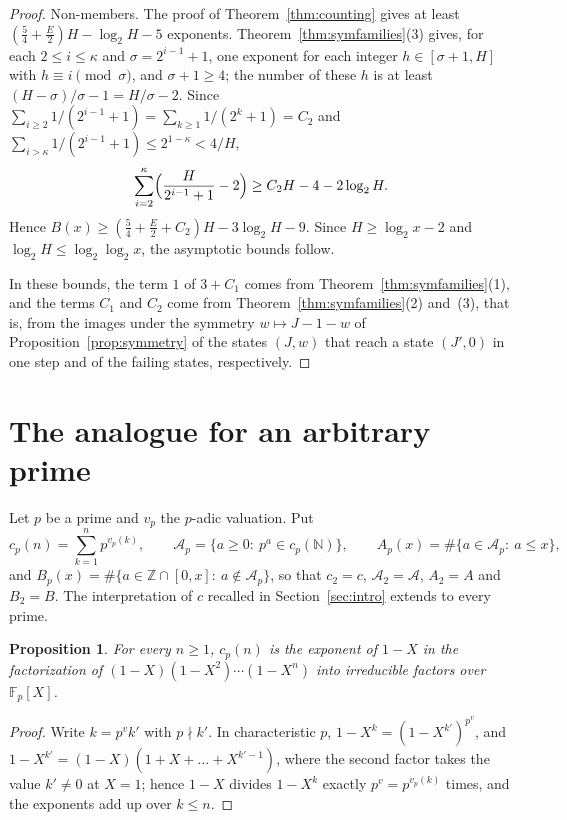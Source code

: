 \documentclass[11pt]{amsart}
\newtheorem{Proposition}[Theorem]{Proposition}
\theoremstyle{definition}
\begin{document}
\begin{proof}
Non-members. The proof of Theorem~\ref{thm:counting} gives at least $(\frac54+\frac E2)H-\log_2H-5$ exponents. Theorem~\ref{thm:symfamilies}(3) gives, for each $2\le i\le\kappa$ and $\sigma=2^{i-1}+1$, one exponent for each integer $h\in[\sigma+1,H]$ with $h\equiv i\pmod\sigma$, and $\sigma+1\ge4$; the number of these $h$ is at least $(H-\sigma)/\sigma-1=H/\sigma-2$. Since $\sum_{i\ge2}1/(2^{i-1}+1)=\sum_{k\ge1}1/(2^k+1)=C_2$ and $\sum_{i>\kappa}1/(2^{i-1}+1)\le2^{1-\kappa}<4/H$,
\[
\sum_{i=2}^{\kappa}\Bigl(\frac{H}{2^{i-1}+1}-2\Bigr)\ge C_2H-4-2\log_2H.
\]
Hence $B(x)\ge(\frac54+\frac E2+C_2)H-3\log_2H-9$. Since $H\ge\log_2x-2$ and $\log_2H\le\log_2\log_2x$, the asymptotic bounds follow.

In these bounds, the term $1$ of $3+C_1$ comes from Theorem~\ref{thm:symfamilies}(1), and the terms $C_1$ and $C_2$ come from Theorem~\ref{thm:symfamilies}(2) and~(3), that is, from the images under the symmetry $w\mapsto J-1-w$ of Proposition~\ref{prop:symmetry} of the states $(J,w)$ that reach a state $(J',0)$ in one step and of the failing states, respectively.
\end{proof}

\section{The analogue for an arbitrary prime}
\label{sec:primes}
Let $p$ be a prime and $v_p$ the $p$-adic valuation. Put
\[
c_p(n)=\sum_{k=1}^{n}p^{v_p(k)},\qquad \mathcal{A}_p=\{a\ge0:\ p^a\in c_p(\mathbb{N})\},\qquad A_p(x)=\#\{a\in\mathcal{A}_p:\ a\le x\},
\]
and $B_p(x)=\#\{a\in\mathbb{Z}\cap[0,x]:\ a\notin\mathcal{A}_p\}$, so that $c_2=c$, $\mathcal{A}_2=\mathcal{A}$, $A_2=A$ and $B_2=B$. The interpretation of $c$ recalled in Section~\ref{sec:intro} extends to every prime.

\begin{Proposition}
\label{prop:Fp}
For every $n\ge1$, $c_p(n)$ is the exponent of $1-X$ in the factorization of $(1-X)(1-X^2)\cdots(1-X^n)$ into irreducible factors over $\mathbb{F}_p[X]$.
\end{Proposition}
\begin{proof}
Write $k=p^vk'$ with $p\nmid k'$. In characteristic $p$, $1-X^k=(1-X^{k'})^{p^v}$, and $1-X^{k'}=(1-X)(1+X+\dots+X^{k'-1})$, where the second factor takes the value $k'\neq0$ at $X=1$; hence $1-X$ divides $1-X^k$ exactly $p^v=p^{v_p(k)}$ times, and the exponents add up over $k\le n$.
\end{proof}
\end{document}
